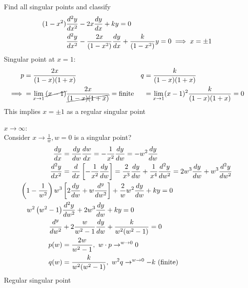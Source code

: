 \documentclass[Maths.tex]{subfiles}
\begin{document}
\begin{example}
Find all singular points and classify
\begin{align}
    (1-x^2)\frac{d^2 y}{dx^2} &- 2x\frac{dy}{dx} + ky = 0 \\
    \frac{d^2 y}{dx^2} &- \frac{2x}{(1-x^2)}\frac{dy}{dx} + \frac{k}{(1-x^2)}y = 0 \implies x = \pm 1
\end{align}
Singular point at $x = 1$:
\begin{align}
    p &= \frac{2x}{(1-x)(1+x)} & q &= \frac{k}{(1-x)(1+x)} \\
    \implies &= \lim_{x\to 1} \cancel{(x-1)}\frac{2x}{\cancel{(1-x)(1+x)}} = \text{finite} & &= \lim_{x\to1}(x-1)^2\frac{k}{(1-x)(1+x)} = 0
\end{align}
This implies $x = \pm 1$ as a regular singular point

$x \to \infty$:\\
Consider $x \to \frac{1}{w}, w = 0$ is a singular point?
\begin{align}
    \frac{dy}{dx} &= \frac{dy}{dw}\frac{dw}{dx} = -\frac{1}{x^2}\frac{dy}{dw} = -w^2\frac{dy}{dw} \\
    \frac{d^2 y}{dx^2} &= \frac{d}{dx}\left[-\frac{1}{x^2}\frac{dy}{dw}\right] = \frac{2}{x^3}\frac{dy}{dw} + \frac{1}{x^4} \frac{d^2y}{dw^2} = 2w^3\frac{dy}{dw} + w^3\frac{d^2y}{dw^2} \\
    \left(1 - \frac{1}{w^2}\right)w^3&\left[2\frac{dy}{dw} + w\frac{d^y}{dw^2}\right] + \frac{2}{w}w^2\frac{dy}{dw} + ky = 0 \\
    w^2\left(w^2-1\right)&\frac{d^2y}{dw^2} + 2w^3\frac{dy}{dw} + ky = 0 \\
    \frac{d^y}{dw^2} &+ 2\frac{w}{w^2-1}\frac{dy}{dw} + \frac{k}{w^2(w^2-1)} = 0 \\
    p(w) &= \frac{2w}{w^2-1}, ~ w\cdot p \to^{w \to 0} 0 \\
    q(w) &= \frac{k}{w^2(w^2-1)}, ~ w^2q \to^{w \to 0} -k \text{ (finite)}
\end{align}
Regular singular point
\end{example}
\end{document}
